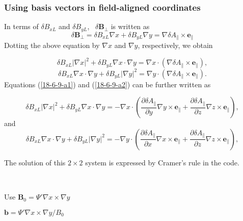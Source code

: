 \documentclass{llncs}
\begin{document}
\subsubsection{Using basis vectors in field-aligned coordinates}

In terms of $\delta B_{x L}$ and $\delta B_{y L}$, \ $\delta
\mathbf{B}_{\perp}$ is written as
\begin{equation}
  \delta \mathbf{B}_{\perp} = \delta B_{x L} \nabla x + \delta B_{y L} \nabla
  y = \nabla \delta A_{\parallel} \times \mathbf{e}_{\parallel}
\end{equation}
Dotting the above equation by $\nabla x$ and $\nabla y$, respectively, we
obtain


\begin{equation}
  \label{18-6-9-a1} \delta B_{x L} | \nabla x |^2 + \delta B_{y L} \nabla x
  \cdot \nabla y = \nabla x \cdot (\nabla \delta A_{\parallel} \times
  \mathbf{e}_{\parallel}),
\end{equation}
\begin{equation}
  \label{18-6-9-a2} \delta B_{x L} \nabla x \cdot \nabla y + \delta B_{y L} |
  \nabla y |^2 = \nabla y \cdot (\nabla \delta A_{\parallel} \times
  \mathbf{e}_{\parallel}) .
\end{equation}
Equations (\ref{18-6-9-a1}) and (\ref{18-6-9-a2}) can be further written as


\begin{equation}
  \delta B_{x L} | \nabla x |^2 + \delta B_{y L} \nabla x \cdot \nabla y = -
  \nabla x \cdot \left( \frac{\partial \delta A_{\parallel}}{\partial y}
  \nabla y \times \mathbf{e}_{\parallel} + \frac{\partial \delta
  A_{\parallel}}{\partial z} \nabla z \times \mathbf{e}_{\parallel} \right),
\end{equation}
and
\begin{equation}
  \delta B_{x L} \nabla x \cdot \nabla y + \delta B_{y L} | \nabla y |^2 = -
  \nabla y \cdot \left( \frac{\partial \delta A_{\parallel}}{\partial x}
  \nabla x \times \mathbf{e}_{\parallel} + \frac{\partial \delta
  A_{\parallel}}{\partial z} \nabla z \times \mathbf{e}_{\parallel} \right),
\end{equation}


The solution of this $2 \times 2$ system is expressed by Cramer's rule in the
code.

\

Use $\mathbf{B}_0 = \Psi' \nabla x \times \nabla y$

$\mathbf{b}= \Psi' \nabla x \times \nabla y / B_0$
\end{document}
